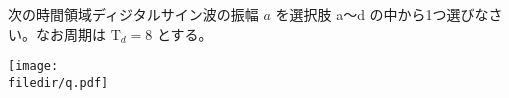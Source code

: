 次の時間領域ディジタルサイン波の振幅 $a$ を選択肢 a〜d の中から1つ選びなさい。なお周期は $\textrm{T}_d = 8$ とする。

\centering\texttt{[image: \\filedir/q.pdf]}
